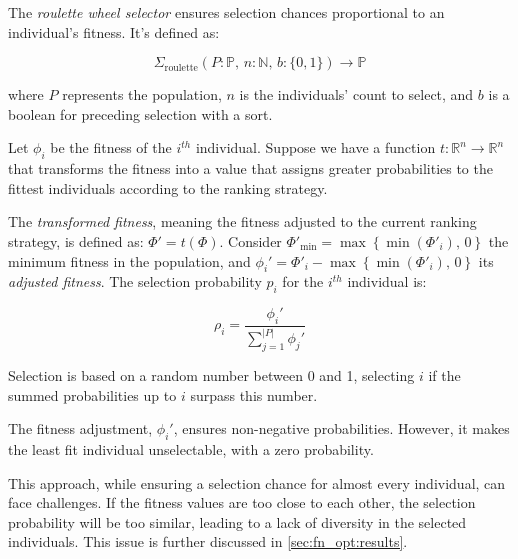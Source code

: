 \begin{definition}
  The \emph{roulette wheel selector} ensures selection chances proportional to an individual's fitness. It's defined 
  as:

  \begin{equation}
    \Sigma_\mathrm{roulette}(P: \mathbb{P},\, n: \mathbb{N},\, b: \{0, 1\}) \to \mathbb{P}
  \end{equation}

  where \(P\) represents the population, \(n\) is the individuals' count to select, and \(b\) is a boolean for 
  preceding selection with a sort.

  Let \(\phi_i\) be the fitness of the \(i^{th}\) individual. Suppose we have a function \(t : \mathbb{R}^n \to 
  \mathbb{R}^n\) that transforms the fitness into a value that assigns greater probabilities to the fittest 
  individuals according to the ranking strategy.

  The \textit{transformed fitness}, meaning the fitness adjusted to the current ranking strategy, is defined as: 
  \(\Phi' = t(\Phi)\).
  Consider \(\Phi'_\mathrm{min} = \max\left\{\min(\Phi'_i),\, 0\right\}\) the minimum fitness in the population, and 
  \(\phi_i' =  \Phi'_i - \max\left\{\min(\Phi'_i),\, 0\right\}\) its \textit{adjusted 
  fitness}.
  The selection probability \(p_i\) for the \(i^{th}\) individual is:

  \begin{equation}
    \rho_i = \frac{\phi_i'}{\sum_{j=1}^{|P|} \phi_j'}
  \end{equation}

  Selection is based on a random number between 0 and 1, selecting \(i\) if the summed probabilities up to \(i\) 
  surpass this number.
\end{definition}

\begin{remark}
  The fitness adjustment, \(\phi_i'\), ensures non-negative probabilities. However, it makes the least fit individual 
  unselectable, with a zero probability.
\end{remark}

This approach, while ensuring a selection chance for almost every individual, can face challenges. If the fitness 
values are too close to each other, the selection probability will be too similar, leading to a lack of diversity in 
the selected individuals. This issue is further discussed in \vref{sec:fn_opt:results}.
